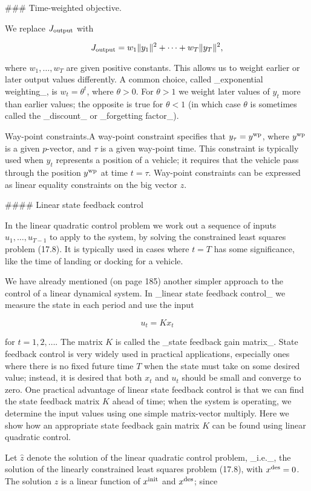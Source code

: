 

### Time-weighted objective.

We replace \(J_{\rm output}\) with

\[J_{\rm output}=w_{1}\|y_{1}\|^{2}+\dots+w_{T}\|y_{T}\|^{2},\]

where \(w_{1},\dots,w_{T}\) are given positive constants. This allows us to weight earlier or later output values differently. A common choice, called _exponential weighting_, is \(w_{t}=\theta^{t}\), where \(\theta>0\). For \(\theta>1\) we weight later values of \(y_{t}\) more than earlier values; the opposite is true for \(\theta<1\) (in which case \(\theta\) is sometimes called the _discount_ or _forgetting factor_).

Way-point constraints.A way-point constraint specifies that \(y_{\tau}=y^{\rm wp}\), where \(y^{\rm wp}\) is a given \(p\)-vector, and \(\tau\) is a given way-point time. This constraint is typically used when \(y_{t}\) represents a position of a vehicle; it requires that the vehicle pass through the position \(y^{\rm wp}\) at time \(t=\tau\). Way-point constraints can be expressed as linear equality constraints on the big vector \(z\).

#### Linear state feedback control

In the linear quadratic control problem we work out a sequence of inputs \(u_{1},\dots,u_{T-1}\) to apply to the system, by solving the constrained least squares problem (17.8). It is typically used in cases where \(t=T\) has some significance, like the time of landing or docking for a vehicle.

We have already mentioned (on page 185) another simpler approach to the control of a linear dynamical system. In _linear state feedback control_ we measure the state in each period and use the input

\[u_{t}=Kx_{t}\]

for \(t=1,2,\dots\). The matrix \(K\) is called the _state feedback gain matrix_. State feedback control is very widely used in practical applications, especially ones where there is no fixed future time \(T\) when the state must take on some desired value; instead, it is desired that both \(x_{t}\) and \(u_{t}\) should be small and converge to zero. One practical advantage of linear state feedback control is that we can find the state feedback matrix \(K\) ahead of time; when the system is operating, we determine the input values using one simple matrix-vector multiply. Here we show how an appropriate state feedback gain matrix \(K\) can be found using linear quadratic control.

Let \(\hat{z}\) denote the solution of the linear quadratic control problem, _i.e._, the solution of the linearly constrained least squares problem (17.8), with \(x^{\rm des}=0\). The solution \(\hat{z}\) is a linear function of \(x^{\rm init}\) and \(x^{\rm des}\); since